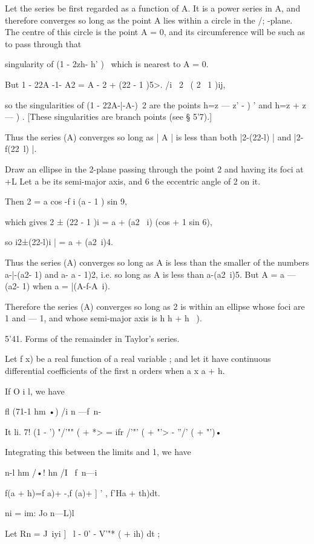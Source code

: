 {{Let the series be first regarded as a function of A. It is a power series in A, and 
therefore converges so long as the point A lies within a circle in the /; -plane. The centre 
of this circle is the point A = 0, and its circumference will be such as to pass through that 

singularity of (1 - 2zh- h' )~  which is nearest to A = 0. 

But 1 - 22A -1- A2 =  A - 2 + (22 - 1 )5>.  /i \  2 \  ( 2 \  1 )ij,  

so the singularities of (1 - 22A-|-A-)~2 are the points h=z —  z' - ) '  and h=z +  z  —  )   . 
[These singularities are branch points (see § 5'7).] 

Thus the series (A) converges so long as | A | is less than both 
|2-(22-l) | and |2-f(22\ l)  |. 

Draw an ellipse in the 2-plane passing through the point 2 and having its foci at +L 
Let a be its semi-major axis, and 6 the eccentric angle of 2 on it. 

Then 2 = a cos   -f i (a  - 1 )  sin 9, 

which gives 2 ± (22 - 1 )i =  a + (a2 \  i)   (cos   + 1 sin 6), 

so i2±(22-l)i | = a + (a2\ i)4. 

Thus the series (A) converges so long as A is less than the smaller of the numbers 
a-|-(a2- 1)  and a- a - 1)2, i.e. so long as A is less than a-(a2\ i)5. But A = a — (a2- 1)  
when a = |(A-f-A~i). 

Therefore the series (A) converges so long as 2 is within an ellipse whose foci are 1 and 
— 1, and whose semi-major axis is h  h + h~ ). 

5'41. Forms of the remainder in Taylor's series. 

Let f x) be a real function of a real variable ; and let it have continuous 
differential coefficients of the first n orders when a x a + h. 

If O i l, we have 

fl (71-1 hm •) /i  n —f\ n-\ 

It li.  7! (1 - ') "/'"" (  +  *>  =  ifr /'"' (  + "'> - ''/' (  + "')• 

Integrating this between the limits and 1, we have 

n-l hm /•! hn /I \  f\ n—i 

f(a + h)=f a)+  -,f (a)+ ] ' , f'Ha + th)dt. 

ni = im: Jo  n—L)l 

Let Rn =  J~iyi ] \ l - 0' - V'"* (  + ih) dt ; 

}}
